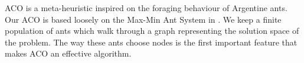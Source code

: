 ACO is a meta-heuristic inspired on the foraging behaviour of Argentine ants. Our ACO is based loosely on the Max-Min Ant System in \cite{stutzle2000max}. We keep a finite population of ants which walk through a graph representing the solution space of the problem. The way these ants choose nodes is the first important feature that makes ACO an effective algorithm.  
